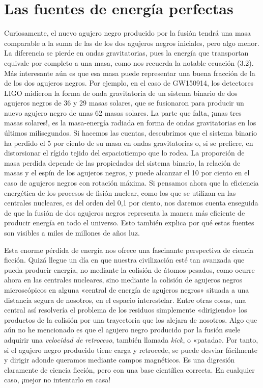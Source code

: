 \section{Las fuentes de energía perfectas}\label{sec:08-energy}

Curiosamente, el nuevo agujero negro producido por la fusión tendrá una masa comparable a la suma de las de los dos agujeros negros iniciales, pero algo menor. La diferencia se pierde en ondas gravitatorias, pues la energía que transportan equivale por completo a una masa, como nos recuerda la notable ecuación (3.2). Más interesante aún es que esa masa puede representar una buena fracción de la de los dos agujeros negros. Por ejemplo, en el caso de GW150914, los detectores LIGO midieron la forma de onda gravitatoria de un sistema binario de dos agujeros negros de 36 y 29 masas solares, que se fusionaron para producir un nuevo agujero negro de unas 62 masas solares. La parte que falta, ¡unas tres masas solares!, es la masa-energía radiada en forma de ondas gravitatorias en los últimos milisegundos. Si hacemos las cuentas, descubrimos que el sistema binario ha perdido el 5 por ciento de su masa en ondas gravitatorias o, si se prefiere, en distorsionar el rígido tejido del espaciotiempo que lo rodea. La proporción de masa perdida depende de las propiedades del sistema binario, la relación de masas y el espín de los agujeros negros, y puede alcanzar el 10 por ciento en el caso de agujeros negros con rotación máxima. Si pensamos ahora que la eficiencia energética de los procesos de fisión nuclear, como los que se utilizan en las centrales nucleares, es del orden del 0,1 por ciento, nos daremos cuenta enseguida de que la fusión de dos agujeros negros representa la manera más eficiente de producir energía en todo el universo. Esto también explica por qué estas fuentes son visibles a miles de millones de años luz.

Esta enorme pérdida de energía nos ofrece una fascinante perspectiva de ciencia ficción. Quizá llegue un día en que nuestra civilización esté tan avanzada que pueda producir energía, no mediante la colisión de átomos pesados, como ocurre ahora en las centrales nucleares, sino mediante la colisión de agujeros negros microscópicos en alguna «central de energía de agujeros negros» situada a una distancia segura de nosotros, en el espacio interestelar. Entre otras cosas, una central así resolvería el problema de los residuos simplemente «dirigiendo» los productos de la colisión por una trayectoria que los alejara de nosotros. Algo que aún no he mencionado es que el agujero negro producido por la fusión suele adquirir una \emph{velocidad de retroceso}, también llamada \emph{kick}, o «patada». Por tanto, si el agujero negro producido tiene carga y retrocede, se puede desviar fácilmente y dirigir adonde queramos mediante campos magnéticos. Es una digresión claramente de ciencia ficción, pero con una base científica correcta. En cualquier caso, ¡mejor no intentarlo en casa!

